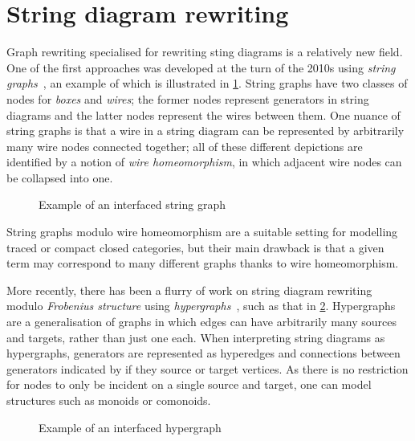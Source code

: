 \section{String diagram rewriting}

Graph rewriting specialised for rewriting sting diagrams is a
relatively new field.
One of the first approaches was developed at the turn of the 2010s using
\emph{string graphs}~\cite{%
    dixon2010open,dixon2013opengraphs,kissinger2012pictures%
}, an example of which is illustrated in \cref{fig:string-graph}.
String graphs have two classes of nodes for \emph{boxes} and \emph{wires}; the
former nodes represent generators in string diagrams and the latter nodes
represent the wires between them.
One nuance of string graphs is that a wire in a string diagram can be
represented by arbitrarily many wire nodes connected together; all of these
different depictions are identified by a notion of \emph{wire homeomorphism}, in
which adjacent wire nodes can be collapsed into one.

\begin{figure}
    \centering
    \caption{Example of an interfaced string graph}
    \label{fig:string-graph}
\end{figure}

String graphs modulo wire homeomorphism are a suitable setting for modelling
traced or compact closed categories, but their main drawback is that a given
term may correspond to many different graphs thanks to wire homeomorphism.

More recently, there has been a flurry of work on string
diagram rewriting modulo \emph{Frobenius structure} using
\emph{hypergraphs}~\cite{%
    bonchi2016rewriting,zanasi2017rewriting,bonchi2017confluence,%
    bonchi2018rewriting,bonchi2022string,bonchi2022stringa,bonchi2022stringb%
}, such as that in \cref{fig:hypergraph-intro}.
Hypergraphs are a generalisation of graphs in which edges can have arbitrarily
many sources and targets, rather than just one each.
When interpreting string diagrams as hypergraphs, generators are represented as
hyperedges and connections between generators indicated by if they source or
target vertices.
As there is no restriction for nodes to only be incident on a single source and
target, one can model structures such as monoids or comonoids.

\begin{figure}
    \centering
    \caption{Example of an interfaced hypergraph}
    \label{fig:hypergraph-intro}
\end{figure}

